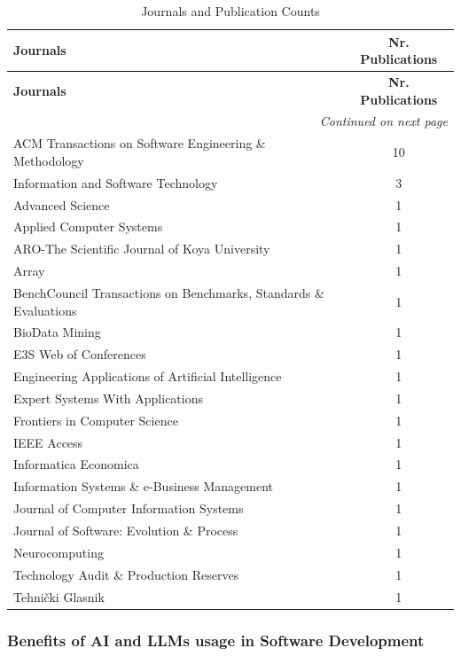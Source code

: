 {\small
\begin{longtable}{p{12cm} c}
\caption{Journals and Publication Counts} \\
\toprule
\textbf{Journals} & \textbf{Nr. Publications} \\
\midrule
\endfirsthead

\toprule
\textbf{Journals} & \textbf{Nr. Publications} \\
\midrule
\endhead

\midrule
\multicolumn{2}{r}{\textit{Continued on next page}} \\
\midrule
\endfoot

\bottomrule
\endlastfoot

\small
ACM Transactions on Software Engineering \& Methodology & 10 \\
Information and Software Technology & 3 \\
Advanced Science & 1 \\
Applied Computer Systems & 1 \\
ARO-The Scientific Journal of Koya University & 1 \\
Array & 1 \\
BenchCouncil Transactions on Benchmarks, Standards \& Evaluations & 1 \\
BioData Mining & 1 \\
E3S Web of Conferences & 1 \\
Engineering Applications of Artificial Intelligence & 1 \\
Expert Systems With Applications & 1 \\
Frontiers in Computer Science & 1 \\
IEEE Access & 1 \\
Informatica Economica & 1 \\
Information Systems \& e-Business Management & 1 \\
Journal of Computer Information Systems & 1 \\
Journal of Software: Evolution \& Process & 1 \\
Neurocomputing & 1 \\
Technology Audit \& Production Reserves & 1 \\
Tehnički Glasnik & 1 \\
\end{longtable}}


\subsubsection{Benefits of AI and LLMs usage in Software Development}

